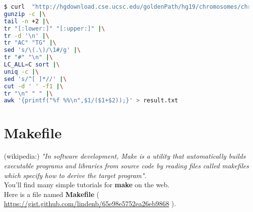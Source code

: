 \documentclass{article}
\begin{document}
\begin{lstlisting}[language=bash]
$ curl  "http://hgdownload.cse.ucsc.edu/goldenPath/hg19/chromosomes/chrM.fa.gz" |\
gunzip -c |\
tail -n +2 |\
tr "[:lower:]" "[:upper:]" |\
tr -d '\n' |\
tr "AC" "TG" |\
sed 's/\(.\)/\1#/g' |\
tr "#" "\n" |\
LC_ALL=C sort |\
uniq -c |\
sed 's/^[ ]*//' |\
cut -d ' ' -f1 |\
tr "\n" " " |\
awk '{printf("%f %%\n",$1/($1+$2));}' > result.txt
\end{lstlisting}

\section{Makefile}
\noindent
(wikipedia:) \emph{"In software development, Make is a utility that automatically builds executable programs and libraries from source code by reading files called makefiles which specify how to derive the target program"}.\\You'll find many simple tutorials for \textbf{make} on the web.\\

Here is a file named \textbf{Makefile} ( \url{https://gist.github.com/lindenb/65e98e5752ea26eb9868} ).
\end{document}
